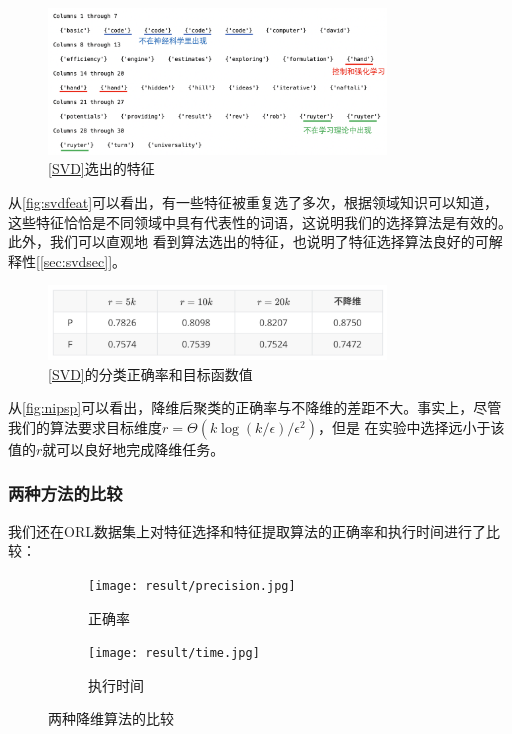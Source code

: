 \documentclass{ctexart}
\begin{document}
    \begin{figure}[H]
        \centering
        \includegraphics[width=0.8\textwidth]{result/words.png}
        \caption{\autoref{SVD}选出的特征}
        \label{fig:svdfeat}
    \end{figure}

    从\autoref{fig:svdfeat}可以看出，有一些特征被重复选了多次，根据领域知识可以知道，
    这些特征恰恰是不同领域中具有代表性的词语，这说明我们的选择算法是有效的。此外，我们可以直观地
    看到算法选出的特征，也说明了特征选择算法良好的可解释性[\autoref{sec:svdsec}]。

    \begin{figure}[H]
        \centering
        \includegraphics[width=0.8\textwidth]{result/nipsp.png}
        \caption{\autoref{SVD}的分类正确率和目标函数值}
        \label{fig:nipsp}
    \end{figure}

    从\autoref{fig:nipsp}可以看出，降维后聚类的正确率与不降维的差距不大。事实上，尽管
    我们的算法要求目标维度$ r = \Theta(k \log(k / \epsilon) / \epsilon^2)$，但是
    在实验中选择远小于该值的$r$就可以良好地完成降维任务。

    \subsubsection{两种方法的比较}
        我们还在ORL数据集上对特征选择和特征提取算法的正确率和执行时间进行了比较：
        \begin{figure}[H]
            \centering
            \begin{subfigure}{.5\textwidth}
                \centering
                \texttt{[image: result/precision.jpg]}
                \caption{正确率}
            \end{subfigure}%
            \begin{subfigure}{.5\textwidth}
                \centering
                \texttt{[image: result/time.jpg]}
                \caption{执行时间}
            \end{subfigure}
            \caption{两种降维算法的比较}
            \label{fig:cmp}
        \end{figure}
\end{document}
